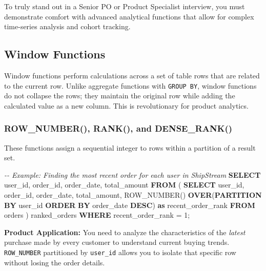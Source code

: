 \documentclass[
  11pt,
  openany,
  oneside]{book}
\newenvironment{Shaded}{}{}
\newcommand{\CommentTok}[1]{\textcolor[rgb]{0.38,0.63,0.69}{\textit{#1}}}
\newcommand{\DecValTok}[1]{\textcolor[rgb]{0.25,0.63,0.44}{#1}}
\newcommand{\FunctionTok}[1]{\textcolor[rgb]{0.02,0.16,0.49}{#1}}
\newcommand{\KeywordTok}[1]{\textcolor[rgb]{0.00,0.44,0.13}{\textbf{#1}}}
\newcommand{\NormalTok}[1]{#1}
\newcommand{\OperatorTok}[1]{\textcolor[rgb]{0.40,0.40,0.40}{#1}}
\begin{document}
To truly stand out in a Senior PO or Product Specialist interview, you
must demonstrate comfort with advanced analytical functions that allow
for complex time-series analysis and cohort tracking.

\subsection{Window Functions}\label{window-functions}

Window functions perform calculations across a set of table rows that
are related to the current row. Unlike aggregate functions with
\texttt{GROUP\ BY}, window functions do not collapse the rows; they
maintain the original row while adding the calculated value as a new
column. This is revolutionary for product analytics.

\subsubsection{ROW\_NUMBER(), RANK(), and
DENSE\_RANK()}\label{row_number-rank-and-dense_rank}

These functions assign a sequential integer to rows within a partition
of a result set.

\begin{Shaded}
\begin{Highlighting}[]
\CommentTok{{-}{-} Example: Finding the most recent order for each user in ShipStream}
\KeywordTok{SELECT} 
\NormalTok{    user\_id,}
\NormalTok{    order\_id,}
\NormalTok{    order\_date,}
\NormalTok{    total\_amount}
\KeywordTok{FROM}\NormalTok{ (}
    \KeywordTok{SELECT} 
\NormalTok{        user\_id, }
\NormalTok{        order\_id, }
\NormalTok{        order\_date, }
\NormalTok{        total\_amount,}
        \FunctionTok{ROW\_NUMBER}\NormalTok{() }\KeywordTok{OVER}\NormalTok{(}\KeywordTok{PARTITION} \KeywordTok{BY}\NormalTok{ user\_id }\KeywordTok{ORDER} \KeywordTok{BY}\NormalTok{ order\_date }\KeywordTok{DESC}\NormalTok{) }\KeywordTok{as}\NormalTok{ recent\_order\_rank}
    \KeywordTok{FROM}\NormalTok{ orders}
\NormalTok{) ranked\_orders}
\KeywordTok{WHERE}\NormalTok{ recent\_order\_rank }\OperatorTok{=} \DecValTok{1}\NormalTok{;}
\end{Highlighting}
\end{Shaded}

\textbf{Product Application:} You need to analyze the characteristics of
the \emph{latest} purchase made by every customer to understand current
buying trends. \texttt{ROW\_NUMBER} partitioned by \texttt{user\_id}
allows you to isolate that specific row without losing the order
details.
\end{document}
